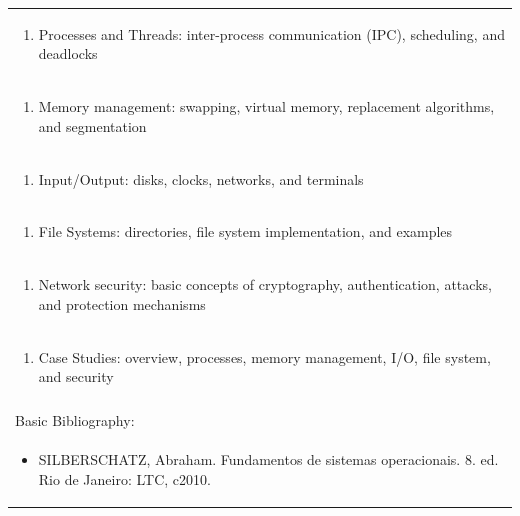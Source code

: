 \documentclass[11pt]{article}
\begin{document}
\begin{center}
\begin{longtable}{|p{4cm}|p{4cm}|p{4cm}|p{4cm}|}
\multicolumn{4}{|p{\dimexpr 16cm + 6\tabcolsep\relax}|}{\begin{enumerate}[start=2]\item Processes and Threads: inter-process communication (IPC), scheduling, and deadlocks\end{enumerate}}\\
\multicolumn{4}{|p{\dimexpr 16cm + 6\tabcolsep\relax}|}{\begin{enumerate}[start=3]\item Memory management: swapping, virtual memory, replacement algorithms, and segmentation\end{enumerate}}\\
\multicolumn{4}{|p{\dimexpr 16cm + 6\tabcolsep\relax}|}{\begin{enumerate}[start=4]\item Input/Output: disks, clocks, networks, and terminals\end{enumerate}}\\
\multicolumn{4}{|p{\dimexpr 16cm + 6\tabcolsep\relax}|}{\begin{enumerate}[start=5]\item File Systems: directories, file system implementation, and examples\end{enumerate}}\\
\multicolumn{4}{|p{\dimexpr 16cm + 6\tabcolsep\relax}|}{\begin{enumerate}[start=6]\item Network security: basic concepts of cryptography, authentication, attacks, and protection mechanisms\end{enumerate}}\\
\multicolumn{4}{|p{\dimexpr 16cm + 6\tabcolsep\relax}|}{\begin{enumerate}[start=7]\item Case Studies: overview, processes, memory management, I/O, file system, and security\end{enumerate}}\\
\multicolumn{4}{|p{\dimexpr 16cm + 6\tabcolsep\relax}|}{}\\
\hline
\multicolumn{4}{|p{16cm}|}{Basic Bibliography:}\\*
\multicolumn{4}{|p{\dimexpr 16cm + 6\tabcolsep\relax}|}{\begin{itemize}\item SILBERSCHATZ, Abraham. Fundamentos de sistemas operacionais. 8. ed. Rio de Janeiro: LTC, c2010.\end{itemize}}\\

\end{longtable}
\end{center}
\end{document}
